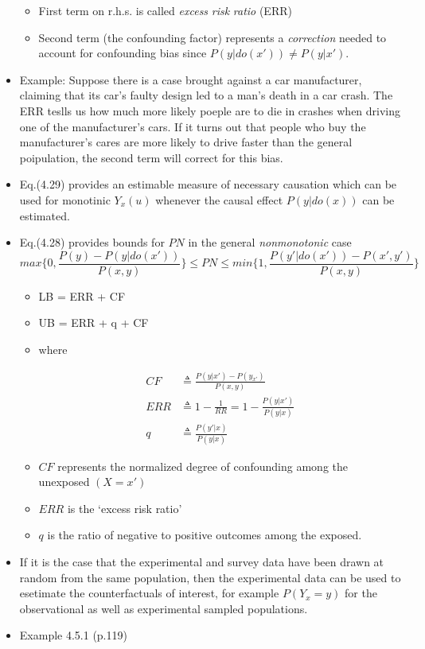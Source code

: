 \documentclass[]{article}
\providecommand{\tightlist}{%
  \setlength{\itemsep}{0pt}\setlength{\parskip}{0pt}}
\begin{document}
\begin{itemize}
  \begin{itemize}
  \tightlist
  \item
    First term on r.h.s. is called \emph{excess} \emph{risk}
    \emph{ratio} (ERR)
  \item
    Second term (the confounding factor) represents a \emph{correction}
    needed to account for confounding bias since
    \(P(y|do(x')) \neq P(y|x')\).
  \end{itemize}
\item
  Example: Suppose there is a case brought against a car manufacturer,
  claiming that its car's faulty design led to a man's death in a car
  crash. The ERR teslls us how much more likely poeple are to die in
  crashes when driving one of the manufacturer's cars. If it turns out
  that people who buy the manufacturer's cares are more likely to drive
  faster than the general poipulation, the second term will correct for
  this bias.
\item
  Eq.(4.29) provides an estimable measure of necessary causation which
  can be used for monotinic \(Y_x(u)\) whenever the causal effect
  \(P(y|do(x))\) can be estimated.
\item
  Eq.(4.28) provides bounds for \(PN\) in the general
  \emph{nonmonotonic} case
  \[max \{ 0, \frac{P(y) - P(y|do(x'))}{P(x,y)} \} \leq PN \leq min \{ 1, \frac{P(y'|do(x')) - P(x', y')}{P(x,y)} \} \]

  \begin{itemize}
  \tightlist
  \item
    LB = ERR + CF
  \item
    UB = ERR + q + CF
  \item
    where

    \begin{equation}
      \begin{split}
    CF &\triangleq \frac{P(y|x') - P(y_{x'})}{P(x,y)} \\
    ERR &\triangleq 1 - \frac{1}{RR} = 1 - \frac{P(y|x')}{P(y|x)} \\
    q &\triangleq \frac{P(y'|x)}{P(y|x)}
      \end{split}
    \end{equation}
  \item
    \(CF\) represents the normalized degree of confounding among the
    unexposed \((X = x')\)
  \item
    \(ERR\) is the `excess risk ratio'
  \item
    \(q\) is the ratio of negative to positive outcomes among the
    exposed.
  \end{itemize}
\item
  If it is the case that the experimental and survey data have been
  drawn at random from the same population, then the experimental data
  can be used to esetimate the counterfactuals of interest, for example
  \(P(Y_x = y)\) for the observational as well as experimental sampled
  populations.
\item
  Example 4.5.1 (p.119)
\end{itemize}
\end{document}
